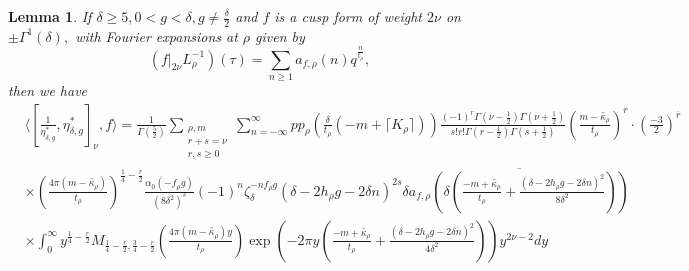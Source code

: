 \documentclass[10pt]{amsart}
\newtheorem{lemma}[theorem]{Lemma}
\theoremstyle{definition}
\theoremstyle{remark}
\numberwithin{equation}{section}
\begin{document}
		\begin{lemma}\label{lem:InnerProdComputation}
		If $\delta\geq 5, 0<g<\delta, g\neq\frac{\delta}{2}$ and $f$ is a cusp form of weight $2\nu$ on $\pm\Gamma^1(\delta),$ with Fourier expansions at $\rho$ given by
		$$
		(f|_{2\nu}L_\rho^{-1})(\tau)=\sum\limits_{n\geq 1} a_{f,\rho}(n)q^{\frac{n}{t_\rho}},
		$$
		 then we have
		\begin{align*}
			&\langle[\frac{1}{\eta_{\delta,g}^\ast},\eta_{\delta,g}^\ast]_\nu,f\rangle = \frac{1}{\Gamma\left(\frac{5}{2}\right)}\sum\limits_{\substack{\rho, m \\ r+s=\nu \\ r,s\geq 0 }}\sum\limits_{n=-\infty}^{\infty}pp_\rho\left(\frac{\delta}{t_\rho}(-m+\lceil K_\rho\rceil)\right)\frac{(-1)^r\Gamma(\nu-\frac{1}{2})\Gamma(\nu+\frac{1}{2})}{s!r!\Gamma(r-\frac{1}{2})\Gamma( s+\frac{1}{2})} \left(\frac{m-\widetilde{\kappa_\rho}}{t_\rho}\right)^r\cdot\left(\frac{-3}{2}\right)^{\overline{r}} \\
			&\times \left(\frac{4\pi(m-\widetilde{\kappa_\rho})}{t_\rho}\right)^{\frac{1}{4}-\frac{r}{2}}\frac{\alpha_0(-f_\rho g)}{(8\delta^2)^s}(-1)^n\zeta_\delta^{-nf_\rho g}(\delta-2h_\rho g-2\delta n)^{2s} \delta \overline{a_{f,\rho}\left(\delta\left(\frac{-m+\widetilde{\kappa_\rho}}{t_\rho}+\frac{(\delta-2h_\rho g-2\delta n)^2}{8\delta^2}\right)\right)} \\
			&\times\int_0^\infty  y^{\frac{1}{4}-\frac{r}{2}}M_{\frac{1}{4}-\frac{r}{2},\frac{3}{4}-\frac{r}{2}}\left(\frac{4\pi(m-\widetilde{\kappa_\rho})y}{t_\rho}\right)\exp\left(-2\pi y\left(\frac{-m+\widetilde{\kappa_\rho}}{t_\rho}+\frac{(\delta-2h_\rho g-2\delta n)^2}{4\delta^2}\right)\right)y^{2\nu-2}dy
		\end{align*}
		
	\end{lemma}
	
\end{document}
